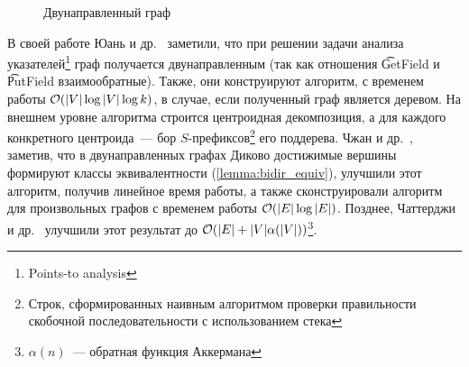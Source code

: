 \begin{figure}[h]
\begin{minipage}[h]{0.5\linewidth}
    \caption{Двунаправленный граф}
    \label{img:path_3_1}
  \end{minipage}
\end{figure}

В своей работе Юань и др.~\cite{Yuan09} заметили, что при решении задачи анализа указателей\footnote{Points-to analysis} граф получается двунаправленным (так как отношения \t{GetField} и \t{PutField} взаимообратные). Также, они конструируют алгоритм, с временем работы $\mathcal{O}(|V| \log |V| \log k)$, в случае, если полученный граф является деревом. На внешнем уровне алгоритма строится центроидная декомпозиция, а для каждого конкретного центроида~--- бор $S$-префиксов\footnote{Строк, сформированных наивным алгоритмом проверки правильности скобочной последовательности с использованием стека} его поддерева. Чжан и др.~\cite{Zhang13}, заметив, что в двунаправленных графах Диково достижимые вершины формируют классы эквивалентности (\ref{lemma:bidir_equiv}), улучшили этот алгоритм, получив линейное время работы, а также сконструировали алгоритм для произвольных графов с временем работы $\mathcal{O}(|E| \log |E|)$. Позднее, Чаттерджи и др.~\cite{Chatterjee17} улучшили этот результат до $\mathcal{O}(|E| + |V| \alpha(|V|))$\footnote{$\alpha(n)$~--- обратная функция Аккермана}.

